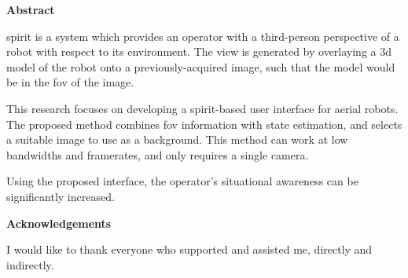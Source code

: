 \newcommand\summaryname{Abstract}
\newenvironment{summary} {
  \cleardoublepage
  \thispagestyle{empty}
  \null\vfill
  \begin{center}
    \bfseries \summaryname
  \end{center}
}
\vfill\null
\begin{summary}
  \gls{spirit} is a system which provides an operator with a third-person perspective of a robot with respect to its environment.
  The view is generated by overlaying a \gls{3d} model of the robot onto a previously-acquired image, such that the model would be in the \gls{fov} of the image.

  This research focuses on developing a \gls{spirit}-based user interface for aerial robots.
  The proposed method combines \gls{fov} information with state estimation, and selects a suitable image to use as a background.
  This method can work at low bandwidths and framerates, and only requires a single camera.

  Using the proposed interface, the operator's situational awareness can be significantly increased.
\end{summary}

\newcommand\ackname{Acknowledgements}
\newenvironment{acknowledgements} {
  \clearpage
  \thispagestyle{empty}
  \null\vfill
  \begin{center}%
    \bfseries \ackname
  \end{center}
}
\vfill\null
\begin{acknowledgements}
  I would like to thank everyone who supported and assisted me, directly and indirectly.
\end{acknowledgements}

\tableofcontents
\listoffigures

\glsresetall  %

